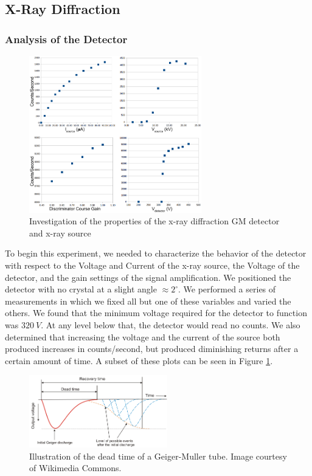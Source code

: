 \documentclass[%
 reprint,
 amsmath,amssymb,
 aps,
 pra,
]{revtex4-1}
\begin{document}
\subsection{X-Ray Diffraction}

\subsubsection{Analysis of the Detector}

\begin{figure}[H]
	\centering
	\includegraphics[width=7.5cm]{xrd_setup_investigation.png}
	\caption{Investigation of the properties of the x-ray diffraction GM detector and x-ray source}
	\label{fig:xrf_setup_investigation}
\end{figure}

To begin this experiment, we needed to characterize the behavior of the detector with respect to the Voltage and Current of the x-ray source, the Voltage of the detector, and the gain settings of the signal amplification. We positioned the detector with no crystal at a slight angle $\approx 2^\circ$. We performed a series of measurements in which we fixed all but one of these variables and varied the others. We found that the minimum voltage required for the detector to function was $320~V$. At any level below that, the detector would read no counts. We also determined that increasing the voltage and the current of the source both produced increases in counts/second, but produced diminishing returns after a certain amount of time. A subset of these plots can be seen in Figure \ref{fig:xrf_setup_investigation}.

\begin{figure}[H]
	\centering
	\includegraphics[width=6cm]{dead_time.png}
	\caption{Illustration of the dead time of a Geiger-Muller tube. Image courtesy of Wikimedia Commons.}
	\label{fig:dead_time}
\end{figure}
\end{document}
